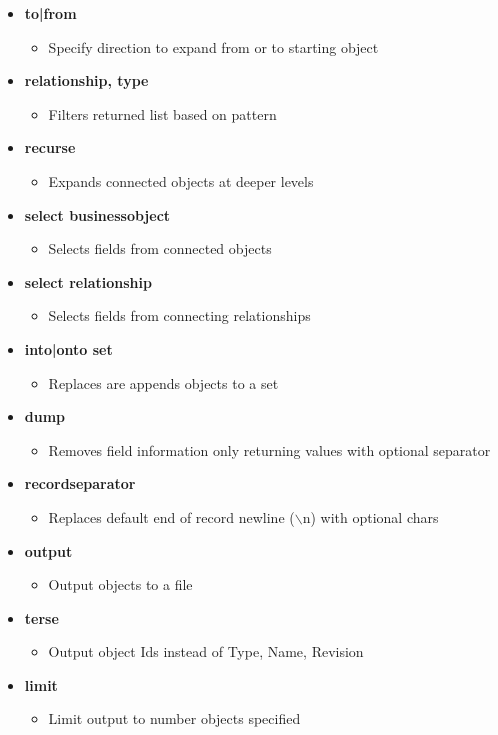 \documentclass[11pt,twoside,a4paper]{article}
\begin{document}
\begin{itemize}
	\item[] \textbf{to|from}
	\begin{itemize}
		\item Specify direction to expand from or to starting object
	\end{itemize}
	\item[] \textbf{relationship, type}
	\begin{itemize}
		\item Filters returned list based on pattern
	\end{itemize}
	\item[] \textbf{recurse}
	\begin{itemize}
		\item Expands connected objects at deeper levels
	\end{itemize}
	\item[] \textbf{select businessobject}
	\begin{itemize}
		\item Selects fields from connected objects
	\end{itemize}
	\item[] \textbf{select relationship}
	\begin{itemize}
		\item Selects fields from connecting relationships
	\end{itemize}
	\item[] \textbf{into|onto set}
	\begin{itemize}
		\item Replaces are appends objects to a set
	\end{itemize}
	\item[] \textbf{dump}
	\begin{itemize}
		\item Removes field information only returning values with optional separator
	\end{itemize}
	\item[] \textbf{recordseparator}
	\begin{itemize}
		\item Replaces default end of record newline ($\backslash$n) with optional chars
	\end{itemize}
	\item[] \textbf{output}
	\begin{itemize}
		\item Output objects to a file
	\end{itemize}
	\item[] \textbf{terse}
	\begin{itemize}
		\item Output object Ids instead of Type, Name, Revision
	\end{itemize}
	\item[] \textbf{limit}
	\begin{itemize}
		\item Limit output to number objects specified
	\end{itemize}
\end{itemize}
\end{document}
